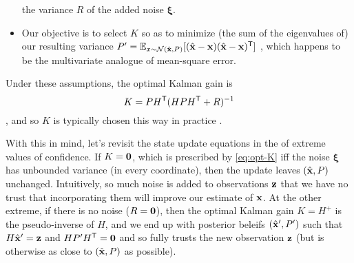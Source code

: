 \begin{subappendices}
\begin{example}
\begin{itemize}
     the variance $R$ of the added noise $\boldsymbol\xi$.
    \item
    Our objective is to select $K$ so as to minimize
    (the sum of the eigenvalues of)
    our resulting variance
    $P' =
    \operatorname*{\mathbb{E}}_{x \sim \mathcal N(\hat{\mathbf x},P)}[ (\hat{\mathbf x} - \mathbf x)(\hat{\mathbf x} - \mathbf x)^{\sf T}]$
    \unskip, which happens to be
    the multivariate analogue of mean-square error.
    \end{itemize}
    Under these assumptions, the optimal Kalman gain is
    \begin{equation}\label{eq:opt-K}
    K = P H^{\sf T} (HPH^{\sf T} + R)^{-1}
    \end{equation}
    \parencite[p. 146]{brown1997introduction}, and so
    $K$ is typically chosen this way in practice
    \parencite{kalmanfilter.net}.

    With this in mind, let's revisit the state update
    equations in the of extreme values of confidence.
    If $K = \mathbf 0$, which is
    prescribed by \eqref{eq:opt-K}
    iff the noise $\boldsymbol\xi$ has unbounded variance (in every coordinate),
    then the update leaves $(\hat{\mathbf x}, P)$ unchanged.
    Intuitively, so much noise is added to observations $\mathbf z$
    that we have no trust that incorporating them will improve our estimate
    of $\mathbf x$.
    At the other extreme,
    if there is no noise
    ($R = \mathbf 0$),
    then the optimal Kalman gain
    $K = H^+$ is the pseudo-inverse of $H$,
    and
    we end up with posterior beleifs
    $(\hat{\mathbf x}', P')$ such that
    $H \hat{\mathbf x}' = \mathbf z$ and $H P' H^{\sf T} = \mathbf 0$
    and so fully trusts the new observation $\mathbf z$
    (but is otherwise as close to $(\hat{\mathbf x}, P)$ as possible).
    \end{example}


\end{subappendices}
